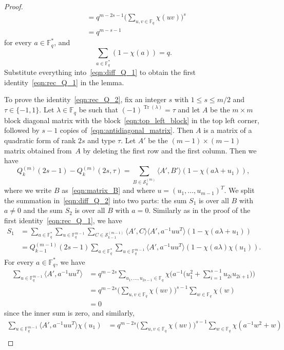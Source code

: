 \documentclass[10pt]{article}
\theoremstyle{definition}
\newcommand{\FF}{\mathbb{F}}
\renewcommand{\S}{\mathscr{S}}
\renewcommand{\t}{\tau}
\newcommand{\ang}[1]{\langle#1\rangle}
\DeclareMathOperator{\Tr}{Tr}
\begin{document}
\begin{proof}
\begin{align*}
&=q^{m-2s-1}\bigg(\sum_{u,v\in\FF_q}\chi(uv)\bigg)^s\\
&=q^{m-s-1}
\end{align*}
for every $a\in\FF_q^*$, and
\[
\sum_{a\in\FF_q^*}(1-\chi(a))=q.
\]
Substitute everything into~\eqref{eqn:diff_Q_1} to obtain the first identity~\eqref{eqn:rec_Q_1} in the lemma.
\par
To prove the identity~\eqref{eqn:rec_Q_2}, fix an integer $s$ with $1\le s\le m/2$ and $\tau\in\{-1,1\}$. Let $\lambda\in\FF_q$ be such that $(-1)^{\Tr(\lambda)}=\t$ and let $A$ be the $m\times m$ block diagonal matrix with the block~\eqref{eqn:top_left_block} in the top left corner, followed by $s-1$ copies of~\eqref{eqn:antidiagonal_matrix}. Then $A$ is a matrix of a quadratic form of rank $2s$ and type $\tau$. Let $A'$ be the $(m-1)\times (m-1)$ matrix obtained from~$A$ by deleting the first row and the first column. Then we have
\begin{equation}
Q^{(m)}_k(2s-1)-Q^{(m)}_k(2s,\tau)=\sum_{B\in\S^{(m)}_k}\ang{A',B'}(1-\chi(a\lambda+u_1)),   \label{eqn:diff_Q_2}
\end{equation}
where we write $B$ as~\eqref{eqn:matrix_B} and where $u=(u_1,\dots,u_{m-1})^T$. We split the summation in~\eqref{eqn:diff_Q_2} into two parts: the sum $S_1$ is over all $B$ with $a\ne 0$ and the sum $S_2$ is over all $B$ with $a=0$. Similarly as in the proof of the first identity~\eqref{eqn:rec_Q_1}, we have
\begin{align}
S_1&=\sum_{a\in\FF_q^*}\sum_{u\in\FF_q^{m-1}}\sum_{C\in\S^{(m-1)}_{k-1}}\ang{A',C}\ang{A',a^{-1}uu^T}(1-\chi(a\lambda+u_1))   \nonumber\\
&=Q^{(m-1)}_{k-1}(2s-1)\sum_{a\in\FF_q^*}\sum_{u\in\FF_q^{m-1}}\ang{A',a^{-1}uu^T}(1-\chi(a\lambda)\chi(u_1)).   \label{eqn:sum_S1}
\end{align}
For every $a\in\FF_q^*$, we have
\begin{align*}
\sum_{u\in\FF_q^{m-1}}\ang{A',a^{-1}uu^T}&=q^{m-2s}\sum_{u_1,\dots,u_{2s-1}\in\FF_q}\chi\bigg(a^{-1}\bigg(u_1^2+\sum_{i=1}^{s-1}u_{2i}u_{2i+1}\bigg)\bigg)\\
&=q^{m-2s}\bigg(\sum_{u,v\in\FF_q}\chi(uv)\bigg)^{s-1}\sum_{w\in\FF_q}\chi(w)\\
&=0
\end{align*}
since the inner sum is zero, and similarly,
\begin{align*}
\sum_{u\in\FF_q^{m-1}}\ang{A',a^{-1}uu^T}\chi(u_1)&=q^{m-2s}\bigg(\sum_{u,v\in\FF_q}\chi(uv)\bigg)^{s-1}\sum_{w\in\FF_q}\chi(a^{-1}w^2+w)\\

\end{align*}
\end{proof}
\end{document}
